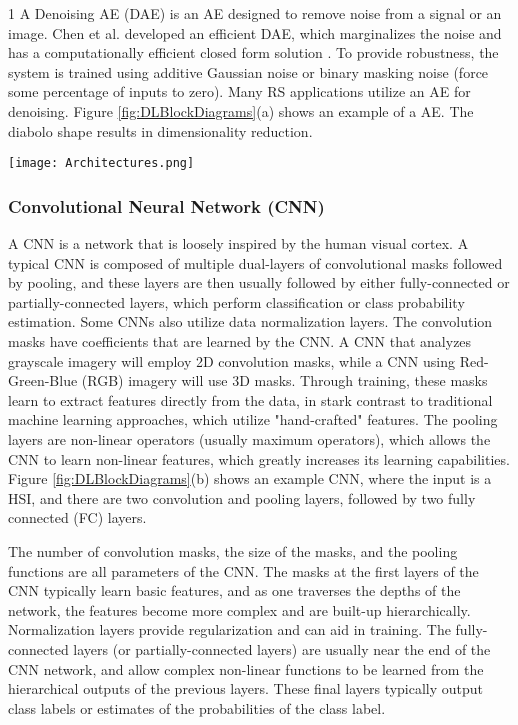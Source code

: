 \documentclass[12pt]{spieman}
\begin{document}
\begin{spacing}{1}
A Denoising AE (DAE) is an AE designed to remove noise from a signal or an image. Chen et al. developed an efficient DAE, which marginalizes the noise and has a computationally efficient closed form solution \cite{chen2012marginalized}. To provide robustness, the system is trained using additive Gaussian noise or binary masking noise (force some percentage of inputs to zero). Many RS applications utilize an AE for denoising. Figure \ref{fig:DLBlockDiagrams}(a) shows an example of a AE. The diabolo shape results in dimensionality reduction.

\begin{figure*}
\begin{center}
 \texttt{[image: Architectures.png]}
 \caption{Block diagrams of DL architectures. (a) AE. (b) CNN. (c) DBN. (d) RNN.}
 \label{fig:DLBlockDiagrams}
\end{center}
\end{figure*}

\subsubsection{Convolutional Neural Network (CNN)}
A CNN is a network that is loosely inspired by the human visual cortex. A typical CNN is composed of multiple dual-layers of convolutional masks followed by pooling, and these layers are then usually followed by either fully-connected or partially-connected layers, which perform classification or class probability estimation. Some CNNs also utilize data normalization layers. The convolution masks have coefficients that are learned by the CNN. A CNN that analyzes grayscale imagery will employ 2D convolution masks, while a CNN using Red-Green-Blue (RGB) imagery will use 3D masks. Through training, these masks learn to extract features directly from the data, in stark contrast to traditional machine learning approaches, which utilize "hand-crafted" features. The pooling layers are non-linear operators (usually maximum operators), which allows the CNN to learn non-linear features, which greatly increases its learning capabilities. Figure \ref{fig:DLBlockDiagrams}(b) shows an example CNN, where the input is a HSI, and there are two convolution and pooling layers, followed by two fully connected (FC) layers.

The number of convolution masks, the size of the masks, and the pooling functions are all parameters of the CNN. The masks at the first layers of the CNN typically learn basic features, and as one traverses the depths of the network, the features become more complex and are built-up hierarchically. Normalization layers provide regularization and can aid in training. The fully-connected layers (or partially-connected layers) are usually near the end of the CNN network, and allow complex non-linear functions to be learned from the hierarchical outputs of the previous layers. These final layers typically output class labels or estimates of the probabilities of the class label.


\end{spacing}
\end{document}

